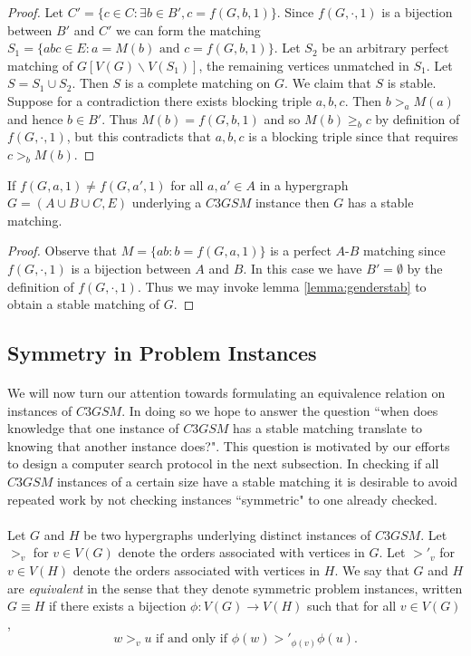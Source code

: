 \begin{proof}
Let $C' = \{ c \in C : \exists b\in B', c = f(G,b,1)\}$. Since $f(G,\cdot,1)$ is a bijection between $B'$ and $C'$ we can form the matching $S_1 = \{abc \in E: a = M(b)\text{ and } c = f(G,b,1)\}$. Let $S_2$ be an arbitrary perfect matching of $G[V(G) \backslash V(S_1)]$, the remaining vertices unmatched in $S_1$. Let $S = S_1 \cup S_2$. Then $S$ is a complete matching on $G$. We claim that $S$ is stable. Suppose for a contradiction there exists blocking triple $a,b,c$. Then $b >_a M(a)$ and hence $b \in B'$. Thus $M(b) = f(G,b,1)$ and so $M(b) \geq_b c$ by definition of $f(G,\cdot,1)$, but this contradicts that $a,b,c$ is a blocking triple since that requires $c >_b M(b)$.
\end{proof}
\begin{corollary}\label{cor:alldiff}
If $f(G,a,1) \neq f(G,a',1)$ for all $a,a' \in A$ in a hypergraph $G=(A\cup B \cup C, E)$ underlying a $C3GSM$ instance then $G$ has a stable matching.
\end{corollary}
\begin{proof}
Observe that $M = \{ab : b = f(G,a,1)\}$ is a perfect $A$-$B$ matching since $f(G,\cdot, 1)$ is a bijection between $A$ and $B$. In this case we have $B' = \emptyset$ by the definition of $f(G,\cdot,1)$. Thus we may invoke lemma \ref{lemma:genderstab} to obtain a stable matching of $G$.
\end{proof}
\subsection{Symmetry in Problem Instances}\label{subsec:symmetry}
\paragraph{}
We will now turn our attention towards formulating an equivalence relation on instances of $C3GSM$. In doing so we hope to answer the question ``when does knowledge that one instance of $C3GSM$ has a stable matching translate to knowing that another instance does?". This question is motivated by our efforts to design a computer search protocol in the next subsection. In checking if all $C3GSM$ instances of a certain size have a stable matching it is desirable to avoid repeated work by not checking instances ``symmetric" to one already checked.

\paragraph{}Let $G$ and $H$ be two hypergraphs underlying distinct instances of $C3GSM$. Let $>_v$ for $v\in V(G)$ denote the orders associated with vertices in $G$. Let $>'_v$ for $v \in V(H)$ denote the orders associated with vertices in $H$. We say that $G$ and $H$ are {\it equivalent} in the sense that they denote symmetric problem instances, written $G \equiv H$ if there exists a bijection $\phi: V(G) \rightarrow V(H)$ such that for all $v \in V(G)$,
 \begin{equation}\label{cond:order}
 w >_v u \text{ if and only if } \phi(w) >'_{\phi(v)} \phi(u).
 \end{equation}
 
